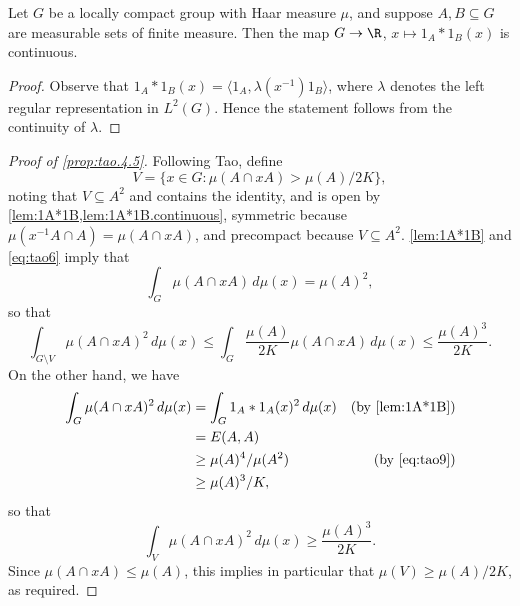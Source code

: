 \begin{lemma}\label{lem:1A*1B.continuous}
Let $G$ be a locally compact group with Haar measure $\mu$, and suppose $A,B\subseteq G$ are measurable sets of finite measure. Then the map $G\to\R$, $x\mapsto 1_A\ast1_B(x)$ is continuous.
\end{lemma}
\begin{proof}
Observe that $1_A\ast1_B(x)=\langle 1_A,\lambda(x^{-1})1_B\rangle$, where $\lambda$ denotes the left regular representation in $L^2(G)$. Hence the statement follows from the continuity of $\lambda$.
\end{proof}
\begin{proof}[Proof of \cref{prop:tao.4.5}]
Following Tao, define
\[
V=\{x\in G:\mu(A\cap xA)>\mu(A)/2K\},
\]
noting that $V\subseteq A^2$ and contains the identity, and is open by \cref{lem:1A*1B,lem:1A*1B.continuous}, symmetric because $\mu(x^{-1}A\cap A)=\mu(A\cap xA)$, and precompact because $V\subseteq A^2$. \cref{lem:1A*1B} and \eqref{eq:tao6} imply that
\[
\int_G\mu(A\cap xA)\,d\mu(x)=\mu(A)^2,
\]
so that
\[
\int_{G\setminus V}\mu(A\cap xA)^2\,d\mu(x)\le\int_G\frac{\mu(A)}{2K}\mu(A\cap xA)\,d\mu(x)\le\frac{\mu(A)^3}{2K}.
\]
On the other hand, we have
\begin{align*}
\int_G\mu(A\cap xA)^2\,d\mu(x)&=\int_G1_A\ast1_A(x)^2\,d\mu(x)&\text{(by \cref{lem:1A*1B})}\\
				&=E(A,A)\\
				&\ge\mu(A)^4/\mu(A^2)&\text{(by \eqref{eq:tao9})}\\
				&\ge\mu(A)^3/K,
\end{align*}
so that
\[
\int_V\mu(A\cap xA)^2\,d\mu(x)\ge\frac{\mu(A)^3}{2K}.
\]
Since $\mu(A\cap xA)\le\mu(A)$, this implies in particular that $\mu(V)\ge\mu(A)/2K$, as required.


\end{proof}
